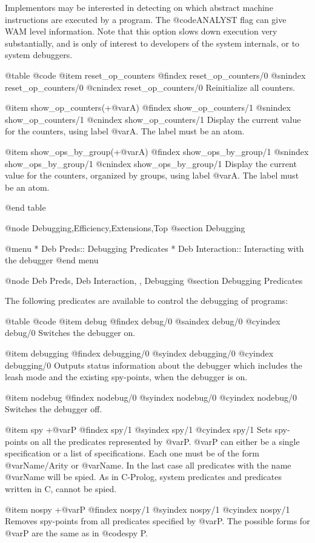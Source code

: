 Implementors may be interested in detecting on which abstract machine
instructions are executed by a program. The @code{ANALYST} flag can give
WAM level information. Note that this option slows down execution very
substantially, and is only of interest to developers of the system
internals, or to system debuggers.

@table @code
@item reset_op_counters
@findex reset_op_counters/0
@snindex reset_op_counters/0
@cnindex reset_op_counters/0
Reinitialize all counters.

@item show_op_counters(+@var{A})
@findex show_op_counters/1
@snindex show_op_counters/1
@cnindex show_op_counters/1
Display the current value for the counters, using label @var{A}. The
label must be an atom.

@item show_ops_by_group(+@var{A})
@findex show_ops_by_group/1
@snindex show_ops_by_group/1
@cnindex show_ops_by_group/1
Display the current value for the counters, organized by groups, using
label @var{A}. The label must be an atom.

@end table

@node Debugging,Efficiency,Extensions,Top 
@section Debugging

@menu
* Deb Preds:: Debugging Predicates
* Deb Interaction:: Interacting with the debugger
@end menu

@node Deb Preds, Deb Interaction, , Debugging
@section Debugging Predicates

The following predicates are available to control the debugging of
programs:

@table @code
@item debug
@findex debug/0
@saindex debug/0
@cyindex debug/0
Switches the debugger on.

@item debugging
@findex debugging/0
@syindex debugging/0
@cyindex debugging/0
Outputs status information about the debugger which includes the leash
mode and the existing spy-points, when the debugger is on.

@item nodebug
@findex nodebug/0
@syindex nodebug/0
@cyindex nodebug/0
Switches the debugger off.

@item spy +@var{P}
@findex spy/1
@syindex spy/1
@cyindex spy/1
 Sets spy-points on all the predicates represented by
@var{P}. @var{P} can either be a single specification or a list of 
specifications. Each one must be of the form @var{Name/Arity} 
or @var{Name}. In the last case all predicates with the name 
@var{Name} will be spied. As in C-Prolog, system predicates and 
predicates written in C, cannot be spied.

@item nospy +@var{P}
@findex nospy/1
@syindex nospy/1
@cyindex nospy/1
 Removes spy-points from all predicates specified by @var{P}.
The possible forms for @var{P} are the same as in @code{spy P}.

